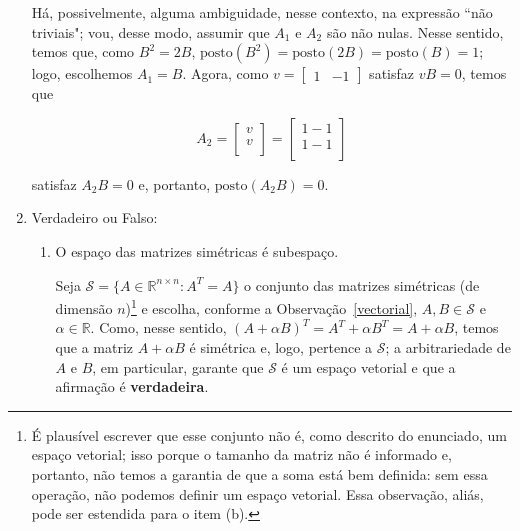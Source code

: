 \documentclass[leqno]{article}
\begin{document}
\begin{enumerate}
    \begin{sol} 
   	Há, possivelmente, alguma ambiguidade, nesse contexto, na expressão  ``não triviais"; vou, desse modo, assumir que $A_{1}$ e $A_{2}$ são não nulas. Nesse sentido, temos que, como $B^{2} = 2B$, $\mathrm{posto}(B^{2}) = \mathrm{posto}(2B) = \mathrm{posto}(B) = 1$; logo, escolhemos $A_{1} = B$. Agora, como $v = \begin{bmatrix} 1 & -1 \end{bmatrix}$ satisfaz $vB = 0$, temos que

	\begin{equation*} 
		A_{2} = 
		\begin{bmatrix} 
			v \\ 
			v \\ 
		\end{bmatrix} = 
		\begin{bmatrix} 
			1 -1 \\ 
			1 -1 \\ 
		\end{bmatrix} 
	\end{equation*} 

	\noindent satisfaz $A_{2}B = 0$ e, portanto, $\mathrm{posto}(A_{2}B) = 0$.  
    \end{sol} 

    \item Verdadeiro ou Falso:

        \begin{enumerate}

            \item O espaço das matrizes simétricas é subespaço.
	    
	    \begin{sol} 
		    Seja $\mathcal{S} = \{A \in \mathbb{R}^{n \times n} : A^{T} = A\}$ o conjunto das matrizes simétricas (de dimensão $n$)\footnote{É plausível escrever que esse conjunto não é, como descrito do enunciado, um espaço vetorial; isso porque o tamanho da matriz não é informado e, portanto, não temos a garantia de que a soma está bem definida: sem essa operação, não podemos definir um espaço vetorial. Essa observação, aliás, pode ser estendida para o item (b).} e escolha, conforme a Observação~\ref{vectorial}, $A, B \in \mathcal{S}$ e $\alpha \in \mathbb{R}$. Como, nesse sentido, $(A + \alpha B)^{T} = A^{T} + \alpha B^{T} = A + \alpha B$, temos que a matriz $A + \alpha B$ é simétrica e, logo, pertence a $\mathcal{S}$; a arbitrariedade de $A$ e $B$, em particular, garante que $\mathcal{S}$ é um espaço vetorial e que a afirmação é \textbf{verdadeira}. 
	    \end{sol} 


\end{enumerate}
\end{enumerate}
\end{document}
